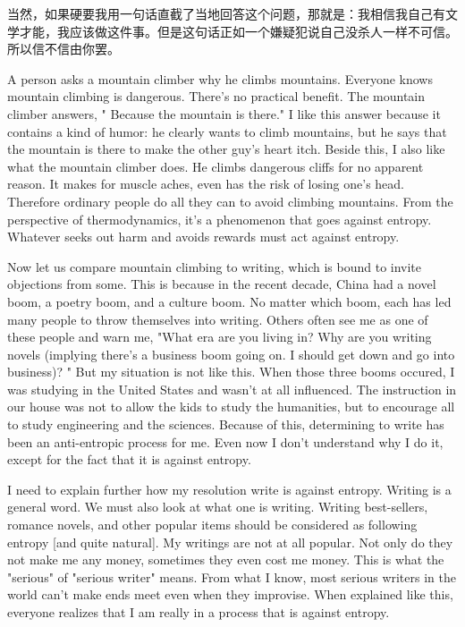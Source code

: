 当然，如果硬要我用一句话直截了当地回答这个问题，那就是：我相信我自己有文学才能，我应该做这件事。但是这句话正如一个嫌疑犯说自己没杀人一样不可信。所以信不信由你罢。


A person asks a mountain climber why he climbs mountains. Everyone knows mountain climbing is dangerous. There's no practical benefit. The mountain climber answers, " Because the mountain is there." I like this answer because it contains a kind of humor: he clearly wants to climb mountains, but he says that the mountain is there to make the other guy's heart itch. Beside this, I also like what the mountain climber does. He climbs dangerous cliffs for no apparent reason. It makes for muscle aches, even has the risk of losing one's head. Therefore ordinary people do all they can to avoid climbing mountains. From the perspective of thermodynamics, it's a phenomenon that goes against entropy. Whatever seeks out harm and avoids rewards must act against entropy. 

Now let us compare mountain climbing to writing, which is bound to invite objections from some. This is because in the recent decade, China had a novel boom, a poetry boom, and a culture boom. No matter which boom, each has led many people to throw themselves into writing. Others often see me as one of these people and warn me, "What era are you living in? Why are you writing novels (implying there's a business boom going on. I should get down and go into business)? " But my situation is not like this. When those three booms occured, I was studying in the United States and wasn't at all influenced. The instruction in our house was not to allow the kids to study the humanities, but to encourage all to study engineering and the sciences. Because of this, determining to write has been an anti-entropic process for me. Even now I don't understand why I do it, except for the fact that it is against entropy. 

I need to explain further how my resolution write is against entropy. Writing is a general word. We must also look at what one is writing. Writing best-sellers, romance novels, and other popular items should be considered as following entropy [and quite natural]. My writings are not at all popular. Not only do they not make me any money, sometimes they even cost me money. This is what the "serious" of "serious writer" means. From what I know, most serious writers in the world can't make ends meet even when they improvise. When explained like this, everyone realizes that I am really in a process that is against entropy. 

